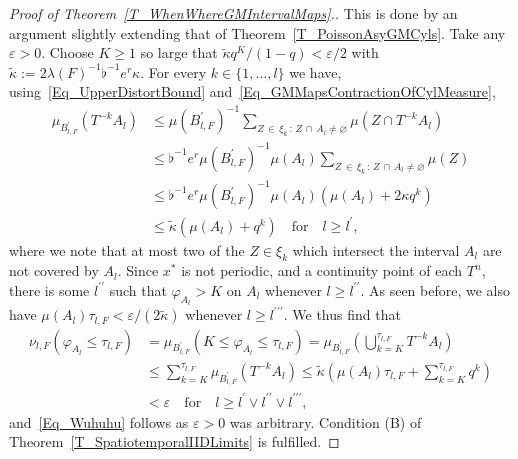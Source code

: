 \documentclass[AHL,Unicode,longabstracts]{cedram}
\begin{document}
\begin{proof}[{Proof of Theorem~\ref{T_WhenWhereGMIntervalMaps}.}]
This is done by an argument slightly extending that of Theorem~\ref{T_PoissonAsyGMCyls}. Take any $\varepsilon>0$. Choose $K\geq1$ so large that $\widetilde{\kappa}q^{K}/(1-q)<\varepsilon/2$ with $\widetilde{\kappa }:=2\lambda(F)^{-1}\flat^{-1}e^{r}\kappa$. For every $k\in\{1,\ldots,l\} $ we have, using~\eqref{Eq_UpperDistortBound} and~\eqref{Eq_GMMapsContractionOfCylMeasure},
\begin{equation}
\begin{split}
\mu_{B_{l,F}^{\prime}}\left(T^{-k}A_{l}\right) & \leq\mu\left(B_{l,F}^{\prime}\right)^{-1} {\textstyle\sum\nolimits_{Z\,\in\,\xi_{k}\,:\,Z\,\cap\,A_{l}\neq\varnothing}}
\mu\left(Z\cap T^{-k}A_{l}\right)\\
& \leq\flat^{-1}e^{r}\mu\left(B_{l,F}^{\prime}\right)^{-1}\mu(A_{l}) {\textstyle\sum\nolimits_{Z\,\in\,\xi_{k}\,:\,Z\,\cap \,A_{l}\neq\varnothing}}
\mu(Z)\\
& \leq\flat^{-1}e^{r}\mu\left(B_{l,F}^{\prime}\right)^{-1}\mu(A_{l})\left(\mu(A_{l})+2\kappa q^{k}\right)\\
& \leq\widetilde{\kappa}\left(\mu(A_{l})+q^{k}\right)\quad \text{for}\quad l\geq l^{\prime },
\end{split}
\end{equation}
where we note that at most two of the $Z\in\xi_{k}$ which intersect the interval $A_{l}$ are not covered by $A_{l}$. Since $x^{\ast}$ is not periodic, and a continuity point of each $T^{n}$, there is some $l^{\prime\prime}$ such that $\varphi_{A_{l}}>K$ on $A_{l}$ whenever $l\geq l^{\prime\prime}$. As seen before, we also have $\mu(A_{l})\tau_{l,F}<\varepsilon/(2\widetilde{\kappa})$ whenever $l\geq l^{\prime\prime\prime}$. We thus find that
\begin{equation}
\begin{split}
\nu_{l,F}\left(\varphi_{A_{l}}\leq\tau_{l,F}\right) & =\mu_{B_{l,F} ^{\prime}}\left(K\leq\varphi_{A_{l}}\leq\tau_{l,F}\right) =\mu _{B_{l,F}^{\prime}}\left({\textstyle\bigcup\nolimits_{k=K}^{\tau_{l,F}}} T^{-k}A_{l}\right)\\
& \leq {\textstyle\sum\nolimits_{k=K}^{\tau_{l,F}}}
\mu_{B_{l,F}^{\prime}}\left(T^{-k}A_{l}\right) \leq\widetilde{\kappa }\left(\mu(A_{l})\tau_{l,F}+ {\textstyle\sum\nolimits_{k=K}^{\tau_{l,F}}} q^{k}\right) \\
& <\varepsilon \quad \text{for} \quad  l\geq l^{\prime}\vee l^{\prime\prime}\vee l^{\prime\prime\prime},
\end{split}
\end{equation}
and~\eqref{Eq_Wuhuhu} follows as $\varepsilon>0$ was arbitrary. Condition (B) of Theorem~\ref{T_SpatiotemporalIIDLimits} is fulfilled.
 

\end{proof}
\end{document}
